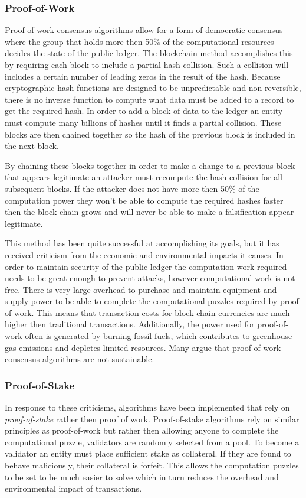 \documentclass[runningheads]{llncs}
\begin{document}
\subsubsection{Proof-of-Work}
Proof-of-work consensus algorithms allow for a form of democratic consensus where the group that holds more then 50\% of the computational resources decides the state of the public ledger. The blockchain method accomplishes this by requiring each block to include a partial hash collision. Such a collision will includes a certain number of leading zeros in the result of the hash. Because cryptographic hash functions are designed to be unpredictable and non-reversible, there is no inverse function to compute what data must be added to a record to get the required hash. In order to add a block of data to the ledger an entity must compute many billions of hashes until it finds a partial collision. These blocks are then chained together so the hash of the previous block is included in the next block. 

By chaining these blocks together in order to make a change to a previous block that appears legitimate an attacker must recompute the hash collision for all subsequent blocks. If the attacker does not have more then 50\% of the computation power they won't be able to compute the required hashes faster then the block chain grows and will never be able to make a falsification appear legitimate.

This method has been quite successful at accomplishing its goals, but it has received criticism from the economic and environmental impacts it causes. In order to maintain security of the public ledger the computation work required needs to be great enough to prevent attacks, however computational work is not free. There is very large overhead to purchase and maintain equipment and supply power to be able to complete the computational puzzles required by proof-of-work. This means that transaction costs for block-chain currencies are much higher then traditional transactions. Additionally, the power used for proof-of-work often is generated by burning fossil fuels, which contributes to greenhouse gas emissions and depletes limited resources. Many argue that proof-of-work consensus algorithms are not sustainable. 

\subsubsection{Proof-of-Stake}
In response to these criticisms, algorithms have been implemented that rely on \emph{proof-of-stake} rather then proof of work. Proof-of-stake algorithms rely on similar principles as proof-of-work but rather then allowing anyone to complete the computational puzzle, validators are randomly selected from a pool. To become a validator an entity must place sufficient stake as collateral. If they are found to behave maliciously, their collateral is forfeit. This allows the computation puzzles to be set to be much easier to solve which in turn reduces the overhead and environmental impact of transactions.
\end{document}
